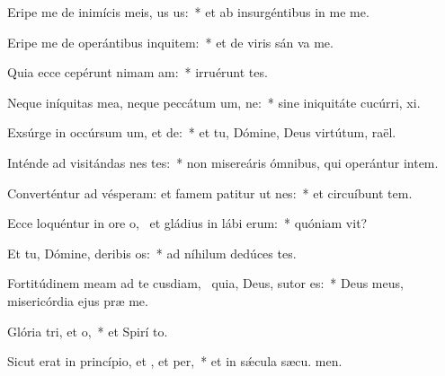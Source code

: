 \item Eripe me de inimícis meis, us us:~* et ab insurgéntibus in me  me.
\item Eripe me de operántibus inquitem:~* et de viris sán va me.
\item Quia ecce cepérunt nimam am:~* irruérunt   tes.
\item Neque iníquitas mea, neque peccátum um, ne:~* sine iniquitáte cucúrri,  xi.
\item Exsúrge in occúrsum um, et de:~* et tu, Dómine, Deus virtútum,  raël.
\item Inténde ad visitándas nes tes:~* non misereáris ómnibus, qui operántur intem.
\item Converténtur ad vésperam: et famem patitur ut nes:~* et circuíbunt tem.
\item Ecce loquéntur in ore o,~\pscross{} et gládius in lábi erum:~* quóniam  vit?
\item Et tu, Dómine, deribis os:~* ad níhilum dedúces  tes.
\item Fortitúdinem meam ad te cusdiam,~\pscross{} quia, Deus, sutor  es:~* Deus meus, misericórdia ejus præ me.
\item Glória tri, et o,~* et Spirí to.
\item Sicut erat in princípio, et , et per,~* et in sǽcula sæcu. men.
